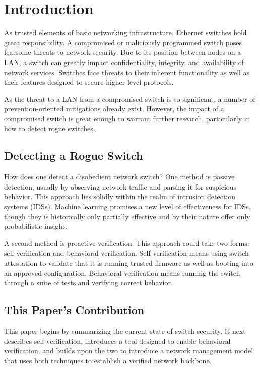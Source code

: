 \documentclass[journal]{IEEEtran}
\begin{document}
\section{Introduction}

As trusted elements of basic networking infrastructure, Ethernet switches hold great
responsibility. A compromised or maliciously programmed switch poses fearsome threats to network
security. Due to its position between nodes on a LAN, a switch can greatly impact confidentiality,
integrity, and availability of network services. Switches face threats to their inherent
functionality as well as their features designed to secure higher level protocols.

As the threat to a LAN from a compromised switch is so significant, a number of prevention-oriented
mitigations already exist. However, the impact of a compromised switch is great enough to warrant
further research, particularly in how to detect rogue switches.

\subsection{Detecting a Rogue Switch}
How does one detect a disobedient network switch? One method is passive detection, usually by
observing network traffic and parsing it for suspicious behavior. This approach lies solidly within
the realm of intrusion detection systems (IDSs). Machine learning promises a new level of
effectiveness for IDSs, though they is historically only partially effective and by their nature
offer only probabilistic insight.

A second method is proactive verification. This approach could take two forms: self-verification
and behavioral verification. Self-verification means using switch attestation to validate that it
is running trusted firmware as well as booting into an approved configuration. Behavioral
verification means running the switch through a suite of tests and verifying correct behavior.

\subsection{This Paper's Contribution}
This paper begins by summarizing the current state of switch security. It next describes
self-verification, introduces a tool designed to enable behavioral verification, and builds upon the
two to introduce a network management model that uses both techniques to establish a verified
network backbone.
\end{document}
